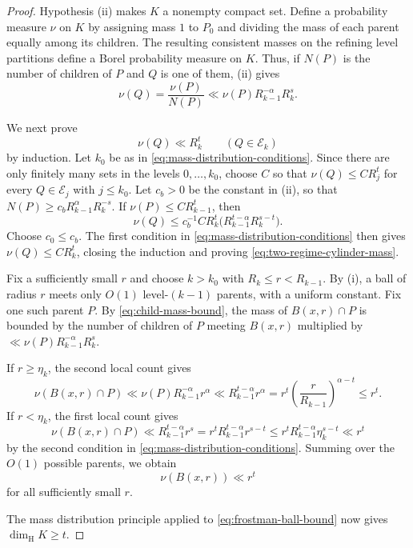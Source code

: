\documentclass[11pt]{amsart}
\newcommand{\dimH}{\dim_{\mathrm H}}
\begin{document}
\begin{proof}
Hypothesis \textup{(ii)} makes $K$ a nonempty compact set.  Define a probability
measure $\nu$ on $K$ by assigning mass $1$ to $P_0$ and dividing the mass of
each parent equally among its children.  The resulting consistent masses on
the refining level partitions define a Borel probability measure on $K$.
Thus, if $N(P)$ is the number of children of $P$ and $Q$ is one of them,
\textup{(ii)} gives
\begin{equation}\label{eq:child-mass-bound}
 \nu(Q)=\frac{\nu(P)}{N(P)}
 \ll \nu(P)R_{k-1}^{-\alpha}R_k^s.
\end{equation}

We next prove
\begin{equation}\label{eq:two-regime-cylinder-mass}
 \nu(Q)\ll R_k^t\qquad(Q\in\mathcal E_k)
\end{equation}
by induction.  Let $k_0$ be as in \eqref{eq:mass-distribution-conditions}.  Since there are only finitely many sets in
the levels $0,\ldots,k_0$, choose $C$ so that
$\nu(Q)\le C R_j^t$ for every $Q\in\mathcal E_j$ with $j\le k_0$.
Let $c_b>0$ be the constant in \textup{(ii)}, so that
$N(P)\ge c_bR_{k-1}^\alpha R_k^{-s}$.  If
$\nu(P)\le C R_{k-1}^t$, then
$$
 \nu(Q)
 \le c_b^{-1}C R_k^t
 \bigl(R_{k-1}^{t-\alpha}R_k^{s-t}\bigr).
$$
Choose $c_0\le c_b$.  The first condition in
\eqref{eq:mass-distribution-conditions} then gives
$\nu(Q)\le C R_k^t$, closing the induction and proving
\eqref{eq:two-regime-cylinder-mass}.

Fix a sufficiently small $r$ and choose $k>k_0$ with
$R_k\le r<R_{k-1}$.  By \textup{(i)}, a ball of radius $r$ meets only $O(1)$
level-$(k-1)$ parents, with a uniform constant.  Fix one such parent $P$.
By \eqref{eq:child-mass-bound}, the mass of $B(x,r)\cap P$ is bounded by the
number of children of $P$ meeting $B(x,r)$ multiplied by
$\ll \nu(P)R_{k-1}^{-\alpha}R_k^s$.

If $r\ge\eta_k$, the second local count gives
$$
 \nu(B(x,r)\cap P)
 \ll \nu(P)R_{k-1}^{-\alpha}r^\alpha
 \ll R_{k-1}^{t-\alpha}r^\alpha
 =r^t\left(\frac r{R_{k-1}}\right)^{\alpha-t}
 \le r^t.
$$
If $r<\eta_k$, the first local count gives
$$
 \nu(B(x,r)\cap P)
 \ll R_{k-1}^{t-\alpha}r^s
 =r^t R_{k-1}^{t-\alpha}r^{s-t}
 \le r^t R_{k-1}^{t-\alpha}\eta_k^{s-t}
 \ll r^t
$$
by the second condition in \eqref{eq:mass-distribution-conditions}.  Summing over the
$O(1)$ possible parents, we obtain
\begin{equation}\label{eq:frostman-ball-bound}
 \nu(B(x,r))\ll r^t
\end{equation}
for all sufficiently small $r$.

The mass distribution principle applied to
\eqref{eq:frostman-ball-bound} now gives $\dimH K\ge t$.
\end{proof}
\end{document}
